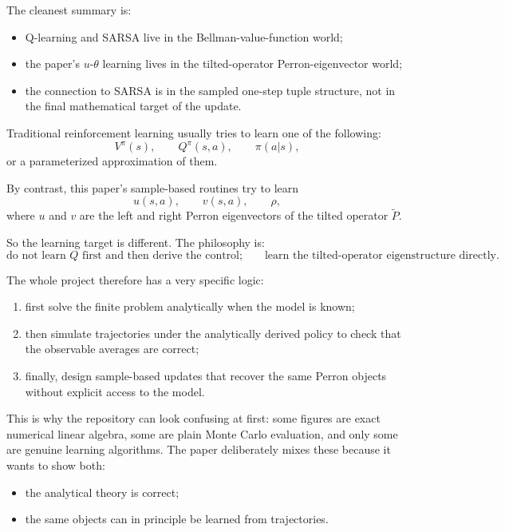 \documentclass[11pt]{article}
\begin{document}
The cleanest summary is:
\begin{itemize}
    \item Q-learning and SARSA live in the Bellman-value-function world;
    \item the paper's \(u\)-\(\theta\) learning lives in the tilted-operator Perron-eigenvector
    world;
    \item the connection to SARSA is in the sampled one-step tuple structure, not in the final
    mathematical target of the update.
\end{itemize}

Traditional reinforcement learning usually tries to learn one of the following:
\begin{equation}
    V^\pi(s), \qquad Q^\pi(s,a), \qquad \pi(a|s),
\end{equation}
or a parameterized approximation of them.

By contrast, this paper's sample-based routines try to learn
\begin{equation}
    u(s,a), \qquad v(s,a), \qquad \rho,
\end{equation}
where \(u\) and \(v\) are the left and right Perron eigenvectors of the tilted operator
\(\widetilde{P}\).

So the learning target is different. The philosophy is:
\begin{equation}
    \text{do not learn } Q \text{ first and then derive the control;}
    \qquad
    \text{learn the tilted-operator eigenstructure directly.}
\end{equation}

The whole project therefore has a very specific logic:
\begin{enumerate}
    \item first solve the finite problem analytically when the model is known;
    \item then simulate trajectories under the analytically derived policy to check that the
    observable averages are correct;
    \item finally, design sample-based updates that recover the same Perron objects without
    explicit access to the model.
\end{enumerate}

This is why the repository can look confusing at first: some figures are exact numerical
linear algebra, some are plain Monte Carlo evaluation, and only some are genuine learning
algorithms. The paper deliberately mixes these because it wants to show both:
\begin{itemize}
    \item the analytical theory is correct;
    \item the same objects can in principle be learned from trajectories.
\end{itemize}
\end{document}
